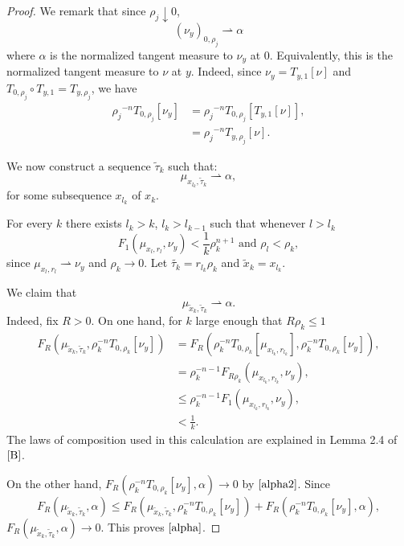 \documentclass[11pt]{article}
\theoremstyle{definition}
\theoremstyle{remark}
\numberwithin{equation}{section}
\begin{document}
\begin{proof}
We remark that since $\rho_j \downarrow 0$, \begin{equation}\label{alpha2}
\left( \nu_{y} \right) _{0, \rho_{j}} \rightharpoonup \alpha 
\end{equation}  
where $\alpha $ is the normalized tangent measure to $\nu_y$ at $0$. Equivalently, this is the normalized tangent measure to $\nu$ at $y$. Indeed, since $\nu_{y}=T_{y,1}[\nu]$ and $T_{0,\rho_{j}}\circ T_{y,1}= T_{y,\rho_j}$, we have \begin{align*}
{\rho_{j}}^{-n}T_{0,\rho_j}[\nu_{y}] &= {\rho_{j}}^{-n}T_{0,\rho_j}[ T_{y,1} [\nu]] , \\
&={\rho_{j}}^{-n} T_{y,\rho_j}[\nu].
\end{align*}


We now construct a sequence $\tilde{\tau}_{k}$ such that:
$$\mu_{{x}_{l_k} , \tilde{\tau}_k} \rightharpoonup \alpha,$$
for some subsequence $x_{l_k}$ of $x_k$.

For every $k$ there exists $l_k>k$, $l_k > l_{k-1}$ such that whenever $l>l_k$ 
\begin{equation}\label{tau}
F_{1} (\mu_{x_l , r_l} , \nu_{y}) < \frac{1}{k} {\rho}_{k}^{n+1} \mbox{ and } \rho_{l} < \rho_{k},
\end{equation} 
since $\mu_{x_l , r_l} \rightharpoonup \nu_{y}$ and $\rho_{k} \to 0$.
Let $\tilde{\tau_{k}} = r_{l_k} \rho_{k}$ and $\tilde{x}_k= x_{l_k}$.

We claim that \begin{equation}\label{alpha}
\mu_{\tilde{x}_k , \tilde{\tau}_k} \rightharpoonup \alpha.
\end{equation}
Indeed, fix $R>0$.
On one hand, for $k$ large enough that $R\rho_{k} \leq 1$ \begin{align*}
F_{R}(\mu_{\tilde{x}_k , \tilde{\tau}_k} , \rho_{k}^{-n} T_{0,\rho_{k}} [\nu_{y}]) &= F_{R}(\rho_{k}^{-n} T_{0,\rho_k}[\mu_{x_{l_k}, r_{l_k}}] , \rho_{k}^{-n} T_{0,\rho_{k}}[\nu_{y}]), \\
& =\rho_{k}^{-n-1} F_{R \rho_{k}}(\mu_{x_{l_k}, r_{l_k}} , \nu_{y}) , \\ & \leq \rho_{k}^{-n-1} F_{1}(\mu_{x_{l_k}, r_{l_k}}, \nu_{y}), \\ &< \frac{1}{k}.
\end{align*}
The laws of composition used in this calculation are explained in Lemma 2.4 of $\cite{B}$.  

On the other hand, $F_R (\rho_{k}^{-n} T_{0,\rho_{k}} [\nu_{y}], \alpha) \to 0$ by $\eqref{alpha2}$.
Since $$F_R(\mu_{\tilde{x}_k , \tilde{\tau}_k},\alpha) \leq F_{R}(\mu_{\tilde{x}_k , \tilde{\tau}_k} , \rho_{k}^{-n} T_{0,\rho_{k}} [\nu_{y}]) + F_R (\rho_{k}^{-n} T_{0,\rho_{k}} [\nu_{y}], \alpha),$$ $F_R(\mu_{\tilde{x}_k , \tilde{\tau}_k},\alpha) \to 0$. 
This proves $\eqref{alpha}$.


\end{proof}
\end{document}
